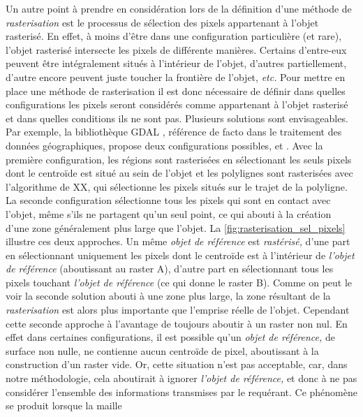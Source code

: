 Un autre point à prendre en considération lors de la définition d'une
méthode de \emph{rasterisation} est le processus de sélection des
pixels appartenant à l'objet rasterisé. En effet, à moins d’être dans
une configuration particulière (et rare), l'objet rasterisé intersecte
les pixels de différente manières. Certains d'entre-eux peuvent être
intégralement situés à l'intérieur de l'objet, d'autres partiellement,
d'autre encore peuvent juste toucher la frontière de l'objet,
\emph{etc.} Pour mettre en place une méthode de rasterisation il est
donc nécessaire de définir dans quelles configurations les pixels
seront considérés comme appartenant à l'objet rasterisé et dans
quelles conditions ils ne sont pas. Plusieurs solutions sont
envisageables. Par exemple, la bibliothèque GDAL \autocite{GDAL2020},
référence de facto dans le traitement des données géographiques,
propose deux configurations possibles,
 et
. Avec la première
configuration, les régions sont rasterisées en sélectionant les seuls
pixels dont le centroïde est situé au sein de l'objet et les
polylignes sont rasterisées avec l'algorithme de XX, qui sélectionne
les pixels situés sur le trajet de la polyligne. La seconde
configuration sélectionne tous les pixels qui sont en contact avec
l'objet, même s'ils ne partagent qu'un seul point, ce qui abouti à la
création d'une zone généralement plus large que l'objet. La
\autoref{fig:rasterisation_sel_pixels} illustre ces deux approches. Un
même \emph{objet de référence} est \emph{rastérisé,} d'une part en
sélectionnant uniquement les pixels dont le centroïde est à
l'intérieur de \emph{l'objet de référence} (aboutissant au raster
\textcolor{RdBu-9-1}{\textsf{A}}), d'autre part en sélectionnant tous
les pixels touchant \emph{l'objet de référence} (ce qui donne le
raster \textcolor{RdBu-9-9}{\textsf{B}}). Comme on peut le voir la
seconde solution abouti à une zone plus large, la zone résultant de la
\emph{rasterisation} est alors plus importante que l'emprise réelle de
l'objet. Cependant cette seconde approche à l'avantage de toujours
aboutir à un raster non nul. En effet dans certaines configurations,
il est possible qu'un \emph{objet de référence,} de surface non nulle,
ne contienne aucun centroïde de pixel, aboutissant à la construction
d'un raster vide. Or, cette situation n'est pas acceptable, car, dans
notre méthodologie, cela aboutirait à ignorer \emph{l'objet de
  référence,} et donc à ne pas considérer l'ensemble des informations
transmises par le requérant. Ce phénomène se produit lorsque la maille

